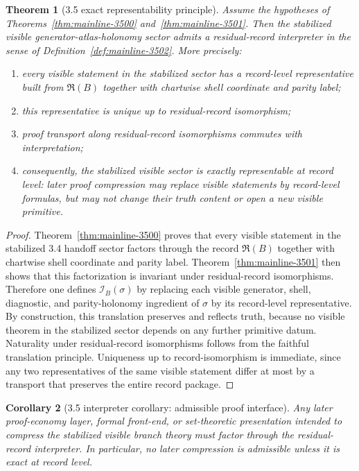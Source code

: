 \documentclass[12pt,a4paper]{article}
\newtheorem{theorem}{Theorem}[section]
\newtheorem{corollary}[theorem]{Corollary}
\begin{document}
\begin{theorem}[3.5 exact representability principle]
\label{thm:mainline-3502}
Assume the hypotheses of Theorems~\ref{thm:mainline-3500} and~\ref{thm:mainline-3501}. Then the stabilized visible generator-atlas-holonomy sector admits a residual-record interpreter in the sense of Definition~\ref{def:mainline-3502}. More precisely:
\begin{enumerate}[label=(\roman*), leftmargin=2em]
 \item every visible statement in the stabilized sector has a record-level representative built from $\mathfrak R(B)$ together with chartwise shell coordinate and parity label;
 \item this representative is unique up to residual-record isomorphism;
 \item proof transport along residual-record isomorphisms commutes with interpretation;
 \item consequently, the stabilized visible sector is \emph{exactly representable} at record level: later proof compression may replace visible statements by record-level formulas, but may not change their truth content or open a new visible primitive.
\end{enumerate}
\end{theorem}

\begin{proof}
Theorem~\ref{thm:mainline-3500} proves that every visible statement in the stabilized 3.4 handoff sector factors through the record $\mathfrak R(B)$ together with chartwise shell coordinate and parity label. Theorem~\ref{thm:mainline-3501} then shows that this factorization is invariant under residual-record isomorphisms. Therefore one defines $\mathcal I_B(\sigma)$ by replacing each visible generator, shell, diagnostic, and parity-holonomy ingredient of $\sigma$ by its record-level representative. By construction, this translation preserves and reflects truth, because no visible theorem in the stabilized sector depends on any further primitive datum. Naturality under residual-record isomorphisms follows from the faithful translation principle. Uniqueness up to record-isomorphism is immediate, since any two representatives of the same visible statement differ at most by a transport that preserves the entire record package.
\end{proof}

\begin{corollary}[3.5 interpreter corollary: admissible proof interface]
\label{cor:mainline-3502}
Any later proof-economy layer, formal front-end, or set-theoretic presentation intended to compress the stabilized visible branch theory must factor through the residual-record interpreter. In particular, no later compression is admissible unless it is exact at record level.
\end{corollary}
\end{document}
